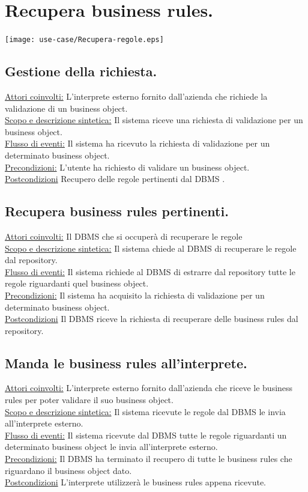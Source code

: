 \section{Recupera business rules.}
\begin{center}
 \texttt{[image: use-case/Recupera-regole.eps]}\
\end{center}

\subsection{Gestione della richiesta.}
\underline{Attori coinvolti:} L'interprete esterno fornito dall'azienda che richiede la validazione di un business object.\\
\underline{Scopo e descrizione sintetica:} Il sistema riceve una richiesta di validazione per un business object.\\
\underline{Flusso di eventi:} Il sistema ha ricevuto la richiesta di validazione per un determinato business object.\\
\underline{Precondizioni:} L'utente ha richiesto di validare un business object.\\
\underline{Postcondizioni} Recupero delle regole pertinenti dal DBMS .

\subsection{Recupera business rules pertinenti.}
\underline{Attori coinvolti:} Il DBMS che si occuper\`a di recuperare le regole\\
\underline{Scopo e descrizione sintetica:} Il sistema chiede al DBMS di recuperare le regole dal repository.\\
\underline{Flusso di eventi:} Il sistema richiede al DBMS di estrarre dal repository tutte le regole riguardanti quel business object.\\
\underline{Precondizioni:} Il sistema ha acquisito la richiesta di validazione per un determinato business object.\\
\underline{Postcondizioni} Il DBMS riceve la richiesta di recuperare delle business rules dal repository.
\subsection{Manda le business rules all'interprete.}
\underline{Attori coinvolti:} L'interprete esterno fornito dall'azienda che riceve le business rules per poter validare il suo business object.\\
\underline{Scopo e descrizione sintetica:} Il sistema ricevute le regole dal DBMS le invia all'interprete esterno.\\
\underline{Flusso di eventi:} Il sistema ricevute dal DBMS tutte le regole riguardanti un determinato business object le invia all'interprete esterno.\\
\underline{Precondizioni:} Il DBMS ha terminato il recupero di tutte le business rules che riguardano il business object dato.\\
\underline{Postcondizioni} L'interprete utilizzer\`a le business rules appena ricevute.

